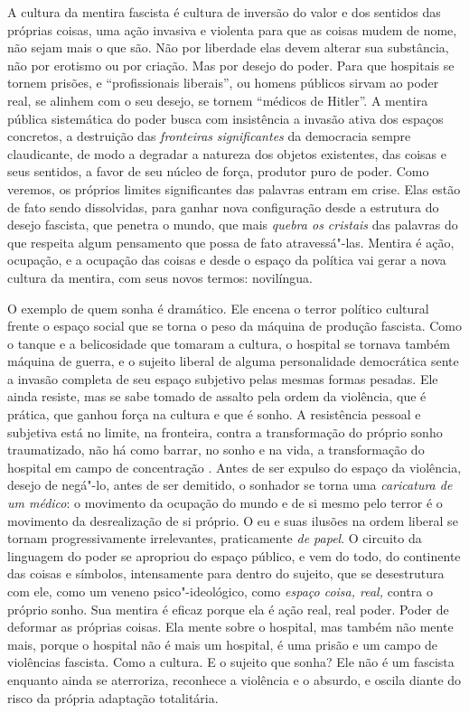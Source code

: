 A cultura da mentira fascista é cultura de inversão do valor e dos
sentidos das próprias coisas, uma ação invasiva e violenta para que as
coisas mudem de nome, não sejam mais o que são. Não por liberdade elas
devem alterar sua substância, não por erotismo ou por criação. Mas por
desejo do poder. Para que hospitais se tornem prisões, e ``profissionais
liberais'', ou homens públicos sirvam ao poder real, se alinhem com o
seu desejo, se tornem ``médicos de Hitler''. A mentira pública
sistemática do poder busca com insistência a invasão ativa dos espaços
concretos, a destruição das \emph{fronteiras} \emph{significantes} da
democracia sempre claudicante, de modo a degradar a natureza dos objetos
existentes, das coisas e seus sentidos, a favor de seu núcleo de força,
produtor puro de poder. Como veremos, os próprios limites significantes
das palavras entram em crise. Elas estão de fato sendo dissolvidas, para
ganhar nova configuração desde a estrutura do desejo fascista, que
penetra o mundo, que mais \emph{quebra os cristais} das palavras do que
respeita algum pensamento que possa de fato atravessá"-las. Mentira é
ação, ocupação, e a ocupação das coisas e desde o espaço da política vai
gerar a nova cultura da mentira, com seus novos termos: novilíngua.

O exemplo de quem sonha é dramático. Ele encena o terror político
cultural frente o espaço social que se torna o peso da máquina de
produção fascista. Como o tanque e a belicosidade que tomaram a cultura,
o hospital se tornava também máquina de guerra, e o sujeito liberal de
alguma personalidade democrática sente a invasão completa de seu espaço
subjetivo pelas mesmas formas pesadas. Ele ainda resiste, mas se sabe
tomado de assalto pela ordem da violência, que é prática, que ganhou
força na cultura e que é sonho. A resistência pessoal e subjetiva está
no limite, na fronteira, contra a transformação do próprio sonho
traumatizado, não há como barrar, no sonho e na vida, a transformação do
hospital em campo de concentração . Antes de ser expulso do espaço da
violência, desejo de negá"-lo, antes de ser demitido, o sonhador se torna
uma \emph{caricatura de um médico}: o movimento da ocupação do mundo e
de si mesmo pelo terror é o movimento da desrealização de si próprio. O
eu e suas ilusões na ordem liberal se tornam progressivamente
irrelevantes, praticamente \emph{de papel}. O circuito da linguagem do
poder se apropriou do espaço público, e vem do todo, do continente das
coisas e símbolos, intensamente para dentro do sujeito, que se
desestrutura com ele, como um veneno psico"-ideológico, como \emph{espaço
coisa, real,} contra o próprio sonho. Sua mentira é eficaz porque ela é
ação real, real poder. Poder de deformar as próprias coisas. Ela mente
sobre o hospital, mas também não mente mais, porque o hospital não é
mais um hospital, é uma prisão e um campo de violências fascista. Como a
cultura. E o sujeito que sonha? Ele não é um fascista enquanto ainda se
aterroriza, reconhece a violência e o absurdo, e oscila diante do risco
da própria adaptação totalitária.


